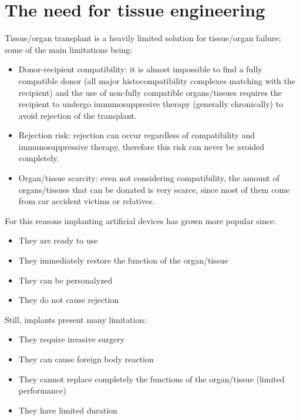 \section{The need for tissue engineering}
  Tissue/organ transplant is a heavily limited solution for tissue/organ failure; some of the main limitations being:
  \begin{itemize}
    \item Donor-recipient compatibility: it is almost impossible to find a fully compatible donor (all major histocompatibility complexes matching with the recipient) and the use of non-fully compatible organs/tissues requires the recipient to undergo immunosuppresive therapy (generally chronically) to avoid rejection of the transplant. 
    \item Rejection risk: rejection can occur regardless of compatibility and immunosuppressive therapy, therefore this risk can never be avoided completely.
    \item Organ/tissue scarcity: even not considering compatibility, the amount of organs/tissues that can be donated is very scarce, since most of them come from car accident victims or relatives. 
  \end{itemize}
  For this reasons implanting artificial devices has grown more popular since:
  \begin{itemize}
    \item They are ready to use
    \item They immediately restore the function of the organ/tissue
    \item They can be personalyzed
    \item They do not cause rejection
  \end{itemize}
  Still, implants present many limitation:
  \begin{itemize}
    \item They require invasive surgery
    \item They can cause foreign body reaction 
    \item They cannot replace completely the functions of the organ/tissue (limited performance)
    \item They have limited duration
  \end{itemize}

